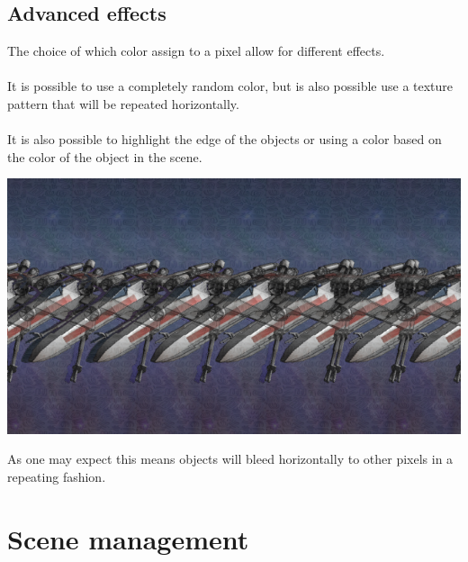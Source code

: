 \documentclass[12pt, a4paper]{article}
\begin{document}
\subsection{Advanced effects}
The choice of which color assign to a pixel allow for different effects.\\\\
It is possible to use a completely random color, but is also possible use a texture pattern that will be repeated horizontally.\\\\
It is also possible to highlight the edge of the objects or using a color based on the color of the object in the scene.
\begin{center}
    \centering
    \includegraphics[width=1.0\textwidth]{img/ship.png}
\end{center}
As one may expect this means objects will bleed horizontally to other pixels in a repeating fashion.
\section{Scene management}
\end{document}
